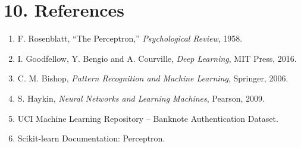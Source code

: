 \documentclass[11pt]{article}
\begin{document}

\section*{10. References}

\begin{enumerate}
\item F. Rosenblatt, ``The Perceptron,'' \emph{Psychological Review}, 1958.
\item I. Goodfellow, Y. Bengio and A. Courville, \emph{Deep Learning}, MIT Press, 2016.
\item C. M. Bishop, \emph{Pattern Recognition and Machine Learning}, Springer, 2006.
\item S. Haykin, \emph{Neural Networks and Learning Machines}, Pearson, 2009.
\item UCI Machine Learning Repository -- Banknote Authentication Dataset.
\item Scikit-learn Documentation: Perceptron.
\end{enumerate}
\end{document}
